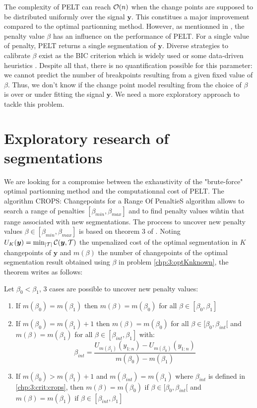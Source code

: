The complexity of PELT can reach ${\mathcal O}(n)$ when the change points are supposed to be distributed uniformly over the signal $\bm y$. This constitues a major improvement compared to the optimal partionning method. However, as mentionned in \cite{Haynes2016}, the penalty value $\beta$ has an influence on the performance of PELT. For a single value of penalty, PELT returns a single segmentation of $\bm y$. Diverse strategies to calibrate $\beta$ exist as the BIC criterion which is widely used \cite{YAO1988181,faure2016comparison,Shi2022} or some data-driven heuristics \cite{Birge2006,Baudry2011,Bardet2012,arlot2009data}. Despite all that, there is no quantification possible for this parameter: we cannot predict the number of breakpoints resulting from a given fixed value of $\beta$. Thus, we don't know if the change point model resulting from the choice of $\beta$ is over or under fitting the signal $\bm y$. We need a more exploratory approach to tackle this problem.   

\section{Exploratory research of segmentations}\label{chp:3:3}

We are looking for a compromise between the exhaustivity of the "brute-force" optimal partionning method and the computationnal cost of PELT. The algorithm CROPS: Changepoints for a Range Of PenaltieS algorithm \cite{haynes2017} allows to search a range of penalties $[\beta_{min},\beta_{max}]$ and to find penalty values wihtin that range associated with new segmentations. The proccess to uncover new penalty values $\beta \in [\beta_{min},\beta_{max}]$ is based on theorem 3 of \cite{haynes2017}. Noting $U_K(\bm y) = \min_{\lvert{\mathcal T}\rvert} {\mathcal C}(\bm y,{\mathcal T})$ the unpenalized cost of the optimal segmentation in $K$ changepoints of $\bm y$ and $m(\beta)$ the number of changepoints of the optimal segmentation result obtained using $\beta$ in problem \ref{chp:3:optKnknown}, the theorem writes as follows:

\begin{theorem}
Let $\beta_0 < \beta_1$, 3 cases are possible to uncover new penalty values:
\begin{enumerate}
  \item If $m(\beta_0) = m(\beta_1)$ then $m(\beta) = m(\beta_0)$ for all $\beta \in [\beta_0,\beta_1]$
  \item If $m(\beta_0) = m(\beta_1)+1$ then $m(\beta) = m(\beta_0)$ for all $\beta\in[\beta_0,\beta_{int}[$ and $m(\beta) = m(\beta_1)$ for all $\beta\in[\beta_{int},\beta_1]$ with:
  \begin{equation}\label{chp:3:crit:crops}
    \beta_{int} = \frac{U_{m(\beta_1)}(y_{1:n})-U_{m(\beta_0)}(y_{1:n})}{m(\beta_0)-m(\beta_1)}
  \end{equation}
  \item If $m(\beta_0) > m(\beta_1)+1$ and $m(\beta_{int}) = m(\beta_1)$ where $\beta_{int}$ is defined in \ref{chp:3:crit:crops}, then $m(\beta) = m(\beta_0)$ if $\beta\in[\beta_0,\beta_{int}[$ and $m(\beta) = m(\beta_1)$ if $\beta\in [\beta_{int},\beta_1]$
\end{enumerate}
\end{theorem} 

